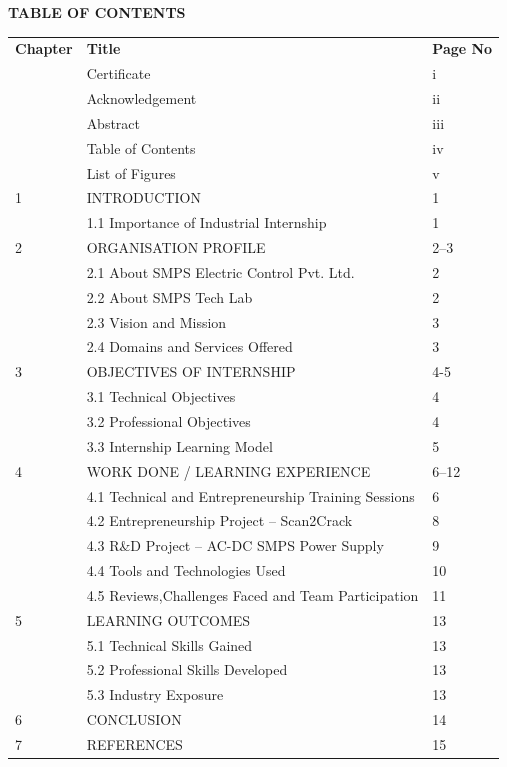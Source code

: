 \documentclass[12pt,a4paper,twocolumn,fleqn]{article}
\begin{document}
\newpage
\begin{center}
{\Large \textbf{TABLE OF CONTENTS}}\\[0.8cm]
\end{center}

\begin{tabular}{p{1.8cm}p{10cm}p{2cm}}

\textbf{Chapter} & \textbf{Title} & \textbf{Page No}\\ 

 & Certificate & i \\ 
 & Acknowledgement & ii \\ 
 & Abstract & iii \\ 
 & Table of Contents & iv \\ 
 & List of Figures & v \\[0.6cm]
 
1 & INTRODUCTION & 1 \\ 
 & 1.1 Importance of Industrial Internship & 1 \\[0.6cm]  

2 & ORGANISATION PROFILE & 2--3 \\ 
 & 2.1 About SMPS Electric Control Pvt. Ltd. & 2 \\ 
 & 2.2 About SMPS Tech Lab & 2 \\ 
 & 2.3 Vision and Mission & 3  \\ 
 & 2.4 Domains and Services Offered & 3\\ [0.6cm]
3 & OBJECTIVES OF INTERNSHIP & 4-5 \\ 
 & 3.1 Technical Objectives &  4\\ 
 & 3.2 Professional Objectives & 4 \\ 
 & 3.3 Internship Learning Model &  5\\ [0.6cm]

4 & WORK DONE / LEARNING EXPERIENCE & 6--12 \\ 
 & 4.1 Technical and Entrepreneurship Training Sessions & 6 \\ 
 & 4.2 Entrepreneurship Project -- Scan2Crack &  8\\ 
 & 4.3 R\&D Project -- AC-DC SMPS Power Supply & 9 \\ 
 & 4.4 Tools and Technologies Used &  10\\ 
 & 4.5 Reviews,Challenges Faced and Team Participation &  11\\ [0.6cm]

5 & LEARNING OUTCOMES & 13 \\ 
 & 5.1 Technical Skills Gained &  13\\ 
 & 5.2 Professional Skills Developed & 13 \\ 
 & 5.3 Industry Exposure &  13\\ [0.6cm]

6 & CONCLUSION & 14 \\ [0.6cm]

7 & REFERENCES  & 15 \\[0.6cm] 


\end{tabular}
\end{document}
